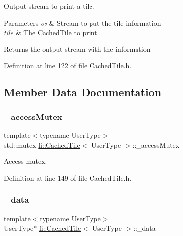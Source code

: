 Output stream to print a tile. 


\begin{DoxyParams}{Parameters}
{\em os} & Stream to put the tile information \\
\hline
{\em tile} & The \hyperlink{classfi_1_1CachedTile}{Cached\+Tile} to print \\
\hline
\end{DoxyParams}
\begin{DoxyReturn}{Returns}
the output stream with the information 
\end{DoxyReturn}


Definition at line 122 of file Cached\+Tile.\+h.



\subsection{Member Data Documentation}
\mbox{\label{classfi_1_1CachedTile_a4e45c4300e3d593dbc5f7ab7f23354a1}} 
\subsubsection{\texorpdfstring{\+\_\+access\+Mutex}{\_accessMutex}}
{\footnotesize\ttfamily template$<$typename User\+Type$>$ \\
std\+::mutex \hyperlink{classfi_1_1CachedTile}{fi\+::\+Cached\+Tile}$<$ User\+Type $>$\+::\+\_\+access\+Mutex\hspace{0.3cm}{\ttfamily [protected]}}



Access mutex. 



Definition at line 149 of file Cached\+Tile.\+h.

\mbox{\label{classfi_1_1CachedTile_a47bd4b69660f58f993b7ff336dc5f188}} 
\subsubsection{\texorpdfstring{\+\_\+data}{\_data}}
{\footnotesize\ttfamily template$<$typename User\+Type$>$ \\
User\+Type$\ast$ \hyperlink{classfi_1_1CachedTile}{fi\+::\+Cached\+Tile}$<$ User\+Type $>$\+::\+\_\+data\hspace{0.3cm}{\ttfamily [protected]}}



